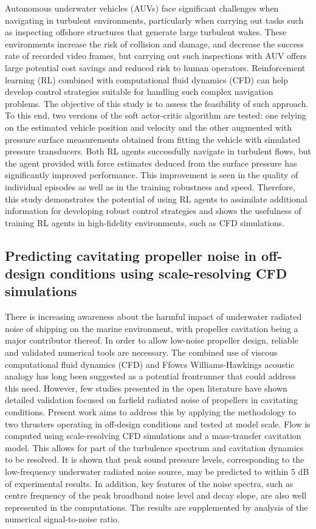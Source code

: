 \documentclass[a4paper,10pt]{article}
\begin{document}
Autonomous underwater vehicles (AUVs) face significant challenges when navigating in turbulent environments, particularly when carrying out tasks such as inspecting offshore structures that generate large turbulent wakes. These environments increase the risk of collision and damage, and decrease the success rate of recorded video frames, but carrying out such inspections with AUV offers large potential cost savings and reduced risk to human operators. Reinforcement learning (RL) combined with computational fluid dynamics (CFD) can help develop control strategies suitable for handling such complex navigation problems. The objective of this study is to assess the feasibility of such approach. To this end, two versions of the soft actor-critic algorithm are tested: one relying on the estimated vehicle position and velocity and the other augmented with pressure surface measurements obtained from fitting the vehicle with simulated pressure transducers. Both RL agents successfully navigate in turbulent flows, but the agent provided with force estimates deduced from the surface pressure has significantly improved performance. This improvement is seen in the quality of individual episodes as well as in the training robustness and speed. Therefore, this study demonstrates the potential of using RL agents to assimilate additional information for developing robust control strategies and shows the usefulness of training RL agents in high-fidelity environments, such as CFD simulations.

\subsection{Predicting cavitating propeller noise in off-design conditions using scale-resolving CFD simulations \cite{lidtke_predicting_2022}}

There is increasing awareness about the harmful impact of underwater radiated noise of shipping on the marine environment, with propeller cavitation being a major contributor thereof. In order to allow low-noise propeller design, reliable and validated numerical tools are necessary. The combined use of viscous computational fluid dynamics (CFD) and Ffowcs Williams-Hawkings acoustic analogy has long been suggested as a potential frontrunner that could address this need. However, few studies presented in the open literature have shown detailed validation focused on farfield radiated noise of propellers in cavitating conditions. Present work aims to address this by applying the methodology to two thrusters operating in off-design conditions and tested at model scale. Flow is computed using scale-resolving CFD simulations and a mass-transfer cavitation model. This allows for part of the turbulence spectrum and cavitation dynamics to be resolved. It is shown that peak sound pressure levels, corresponding to the low-frequency underwater radiated noise source, may be predicted to within 5 dB of experimental results. In addition, key features of the noise spectra, such as centre frequency of the peak broadband noise level and decay slope, are also well represented in the computations. The results are supplemented by analysis of the numerical signal-to-noise ratio.
\end{document}
